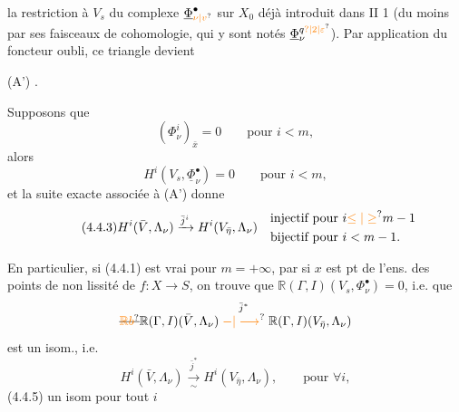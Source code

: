 la restriction à $V_s$ du complexe $\underline\Phi^\bullet_{\unsure{\nu|v}}$  sur $X_0$ déjà  introduit dans II 1 (du moins par ses faisceaux de cohomologie, qui y  sont notés $\underline\Phi_\nu^{q\unsure{?|2|\varepsilon}}$). Par application du foncteur oubli, ce triangle devient

(A')
.


 Supposons que
\[
\tag*{(4.4.1)}
(\Phi^i_\nu)_{\bar x}=0\qquad\text{pour }i<m,
\]
alors 
\[
\tag*{(4.4.2)}
H^i(V_s,\underline\Phi^\bullet_\nu)=0\qquad\text{pour }i<m,
\]
et la suite exacte associée à (A') donne
\[
\tag*{(4.4.3)}
H^i(\bar V,\Lambda_\nu)\xrightarrow{\bar j^i}H^i(V_{\bar\eta},\Lambda_\nu)
\quad\begin{aligned}&\text{injectif pour }i\unsure{\leq|\geq} m-1\\&\text{bijectif pour }i<m-1.
\end{aligned}
\]

En particulier, si (4.4.1) est vrai pour $m=+\infty$, par  si $x$ est pt  de l'ens. des points de non lissité de $f:X\longrightarrow S$, on trouve que $\mathbb R(\Gamma,I)(V_s,\Phi^\bullet_\nu)=0$, i.e. que 
\[
\deleted{\unsure{\mathbb Rb}}\mathbb R(\Gamma,I)(\bar V,\Lambda_\nu)\mathrel{\overset{\bar j^*}{\unsure{-|\longrightarrow}}}\mathbb R(\Gamma,I)(V_{\bar\eta},\Lambda_\nu)
\]
est un isom., i.e.
\[
H^i(\bar V,\Lambda_\nu)\xrightarrow[\sim]{\bar j^*}H^i(V_{\bar\eta},\Lambda_\nu),\qquad\text{pour }\forall i,
\]
 (4.4.5) un isom pour tout $i$

